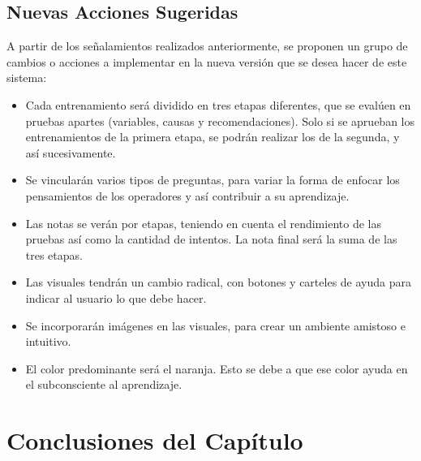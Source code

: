 \subsection{Nuevas Acciones Sugeridas}
A partir de los señalamientos realizados anteriormente, se proponen un grupo de cambios o acciones a implementar en la nueva versión que se desea hacer de este sistema:

\begin{itemize}
\item Cada entrenamiento será dividido en tres etapas diferentes, que se evalúen en pruebas apartes (variables, causas y recomendaciones). Solo si se aprueban los entrenamientos de la primera etapa, se podrán realizar los de la segunda, y así sucesivamente.
\item Se vincularán varios tipos de preguntas, para variar la forma de enfocar los pensamientos de los operadores y así contribuir a su aprendizaje.
\item Las notas se verán por etapas, teniendo en cuenta el rendimiento de las pruebas así como la cantidad de intentos. La nota final será la suma de las tres etapas.
\item Las visuales tendrán un cambio radical, con botones y carteles de ayuda para indicar al usuario lo que debe hacer.
\item Se incorporarán imágenes en las visuales, para crear un ambiente amistoso e intuitivo.
\item El color predominante será el naranja. Esto se debe a que ese color ayuda en el subconsciente al aprendizaje.
\end{itemize}


\section{Conclusiones del Capítulo}